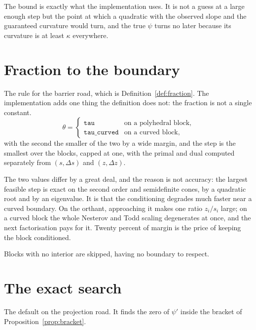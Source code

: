 \documentclass[a4paper,11pt]{book}
\theoremstyle{plain}
\theoremstyle{definition}
\theoremstyle{remark}
\numberwithin{equation}{chapter}
\numberwithin{algorithm}{chapter}
\begin{document}
	The bound is exactly what the implementation uses. It is not a guess at a
	large enough step but the point at which a quadratic with the observed slope
	and the guaranteed curvature would turn, and the true $\psi$ turns no later
	because its curvature is at least $\kappa$ everywhere.

	\section{Fraction to the boundary}

	The rule for the barrier road, which is Definition~\ref{def:fraction}. The
	implementation adds one thing the definition does not: the fraction is not a
	single constant.
	\[
	\theta=
	\begin{cases}
		\texttt{tau} & \text{on a polyhedral block},\\
		\texttt{tau\_curved} & \text{on a curved block},
	\end{cases}
	\]
	with the second the smaller of the two by a wide margin,
	and the step is the smallest over the blocks, capped at one, with the primal
	and dual computed separately from $(s,\Delta s)$ and $(z,\Delta z)$.

	The two values differ by a great deal, and the reason is not accuracy: the
	largest feasible step is exact on the second order and semidefinite cones, by
	a quadratic root and by an eigenvalue. It is that the conditioning degrades
	much faster near a curved boundary. On the orthant, approaching it makes one
	ratio $z_i/s_i$ large; on a curved block the whole Nesterov and Todd scaling
	degenerates at once, and the next factorisation pays for it. Twenty percent of
	margin is the price of keeping the block conditioned.

	Blocks with no interior are skipped, having no boundary to respect.

	\section{The exact search}

	The default on the projection road. It finds the zero of $\psi'$ inside the
	bracket of Proposition~\ref{prop:bracket}.
\end{document}
